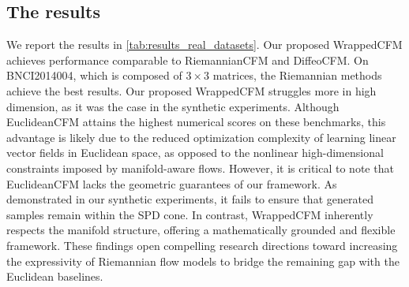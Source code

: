 \documentclass[10pt]{article} %
\theoremstyle{plain}
\theoremstyle{definition}
\theoremstyle{remark}
\begin{document}


\subsection{The results}

We report the results in \cref{tab:results_real_datasets}. Our proposed WrappedCFM achieves performance comparable to RiemannianCFM and DiffeoCFM. On BNCI2014004, which is composed of $3 \times 3$ matrices, the Riemannian methods achieve the best results. Our proposed WrappedCFM struggles more in high dimension, as it was the case in the synthetic experiments. Although EuclideanCFM attains the highest numerical scores on these benchmarks, this advantage is likely due to the reduced optimization complexity of learning linear vector fields in Euclidean space, as opposed to the nonlinear high-dimensional constraints imposed by manifold-aware flows. However, it is critical to note that EuclideanCFM lacks the geometric guarantees of our framework. As demonstrated in our synthetic experiments, it fails to ensure that generated samples remain within the SPD cone. In contrast, WrappedCFM inherently respects the manifold structure, offering a mathematically grounded and flexible framework. These findings open compelling research directions toward increasing the expressivity of Riemannian flow models to bridge the remaining gap with the Euclidean baselines.
\end{document}
